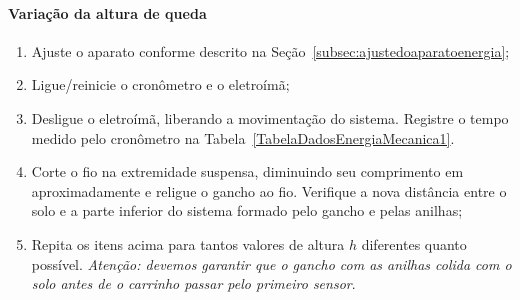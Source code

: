 \paragraph{Variação da altura de queda}
\begin{enumerate}
    \item Ajuste o aparato conforme descrito na Seção~\ref{subsec:ajustedoaparatoenergia};
    	\item Ligue/reinicie o cronômetro e o eletroímã;
	\item Desligue o eletroímã, liberando a movimentação do sistema. Registre o tempo medido pelo cronômetro na Tabela~\ref{TabelaDadosEnergiaMecanica1}.
    \item Corte o fio na extremidade suspensa, diminuindo seu comprimento em aproximadamente  e religue o gancho ao fio. Verifique a nova distância entre o solo e a parte inferior do sistema formado pelo gancho e pelas anilhas;
	\item Repita os itens acima para tantos valores de altura $h$ diferentes quanto possível. \emph{Atenção: devemos garantir que o gancho com as anilhas colida com o solo antes de o carrinho passar pelo primeiro sensor}.
\end{enumerate}

\cleardoublepage


\vspace{15mm}

\begin{fullwidth}
\noindent{}
\vspace{5mm}

\noindent{}

\noindent{}

\noindent{}

\noindent{}

\noindent{}
\end{fullwidth}

